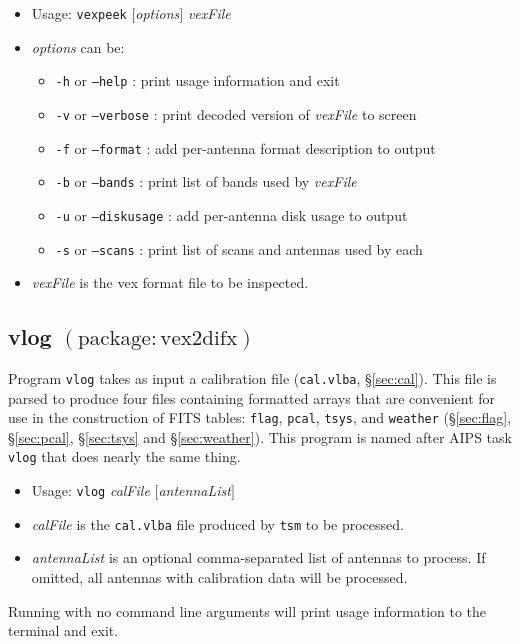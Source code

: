 \begin{itemize}
\item[] Usage: {\tt vexpeek} $[${\em options}$]$ {\em vexFile} 
\item[] {\em options} can be:
\begin{itemize}
\item[] {\tt -h} or {\tt --help} : print usage information and exit
\item[] {\tt -v} or {\tt --verbose} : print decoded version of {\em vexFile} to screen
\item[] {\tt -f} or {\tt --format} : add per-antenna format description to output
\item[] {\tt -b} or {\tt --bands} : print list of bands used by {\em vexFile}
\item[] {\tt -u} or {\tt --diskusage} : add per-antenna disk usage to output
\item[] {\tt -s} or {\tt --scans} : print list of scans and antennas used by each
\end{itemize}
\item[] {\em vexFile} is the vex format file to be inspected.
\end{itemize}






\subsection{vlog {\small $\mathrm{(package: vex2difx)}$}} \label{sec:vlog}

Program {\tt vlog} takes as input a calibration file ({\tt cal.vlba}, \S\ref{sec:cal}).
This file is parsed to produce four files containing formatted arrays that are convenient for use in the construction of FITS tables:
{\tt flag}, {\tt pcal}, {\tt tsys}, and {\tt weather} (\S\ref{sec:flag}, \S\ref{sec:pcal}, \S\ref{sec:tsys} and \S\ref{sec:weather}).
This program is named after AIPS task {\tt vlog} that does nearly the same thing.

\begin{itemize}
\item[] Usage: {\tt vlog} {\em calFile} $[${\em antennaList}$]$
\item[] {\em calFile} is the {\tt cal.vlba} file produced by {\tt tsm} to be processed.
\item[] {\em antennaList} is an optional comma-separated list of antennas to process.
If omitted, all antennas with calibration data will be processed.
\end{itemize}
Running with no command line arguments will print usage information to the terminal and exit.








